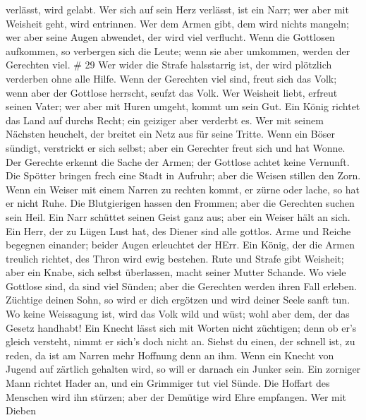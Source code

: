 verlässt, wird gelabt.  Wer sich auf sein Herz verlässt,
ist ein Narr; wer aber mit Weisheit geht, wird entrinnen. 
Wer dem Armen gibt, dem wird nichts mangeln; wer aber seine Augen
abwendet, der wird viel verflucht.  Wenn die Gottlosen
aufkommen, so verbergen sich die Leute; wenn sie aber umkommen, werden
der Gerechten viel. \# 29  Wer wider die Strafe halsstarrig
ist, der wird plötzlich verderben ohne alle Hilfe.  Wenn der
Gerechten viel sind, freut sich das Volk; wenn aber der Gottlose
herrscht, seufzt das Volk.  Wer Weisheit liebt, erfreut
seinen Vater; wer aber mit Huren umgeht, kommt um sein Gut. 
Ein König richtet das Land auf durchs Recht; ein geiziger aber verderbt
es.  Wer mit seinem Nächsten heuchelt, der breitet ein Netz
aus für seine Tritte.  Wenn ein Böser sündigt, verstrickt er
sich selbst; aber ein Gerechter freut sich und hat Wonne. 
Der Gerechte erkennt die Sache der Armen; der Gottlose achtet keine
Vernunft.  Die Spötter bringen frech eine Stadt in Aufruhr;
aber die Weisen stillen den Zorn.  Wenn ein Weiser mit einem
Narren zu rechten kommt, er zürne oder lache, so hat er nicht Ruhe.
 Die Blutgierigen hassen den Frommen; aber die Gerechten
suchen sein Heil.  Ein Narr schüttet seinen Geist ganz aus;
aber ein Weiser hält an sich.  Ein Herr, der zu Lügen Lust
hat, des Diener sind alle gottlos.  Arme und Reiche
begegnen einander; beider Augen erleuchtet der HErr.  Ein
König, der die Armen treulich richtet, des Thron wird ewig bestehen.
 Rute und Strafe gibt Weisheit; aber ein Knabe, sich selbst
überlassen, macht seiner Mutter Schande.  Wo viele Gottlose
sind, da sind viel Sünden; aber die Gerechten werden ihren Fall erleben.
 Züchtige deinen Sohn, so wird er dich ergötzen und wird
deiner Seele sanft tun.  Wo keine Weissagung ist, wird das
Volk wild und wüst; wohl aber dem, der das Gesetz handhabt!
 Ein Knecht lässt sich mit Worten nicht züchtigen; denn ob
er's gleich versteht, nimmt er sich's doch nicht an. 
Siehst du einen, der schnell ist, zu reden, da ist am Narren mehr
Hoffnung denn an ihm.  Wenn ein Knecht von Jugend auf
zärtlich gehalten wird, so will er darnach ein Junker sein.
 Ein zorniger Mann richtet Hader an, und ein Grimmiger tut
viel Sünde.  Die Hoffart des Menschen wird ihn stürzen;
aber der Demütige wird Ehre empfangen.  Wer mit Dieben
